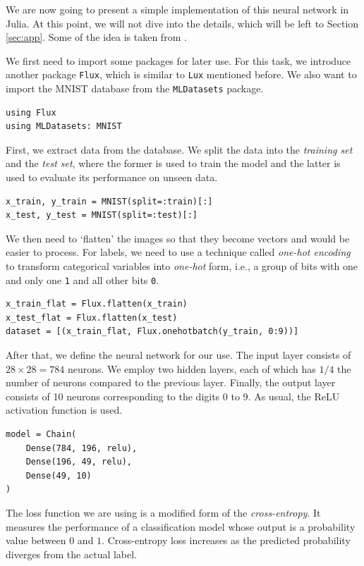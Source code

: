 \documentclass[a4paper,11pt,titlepage]{article}
\theoremstyle{definition}
\theoremstyle{plain}
\theoremstyle{remark}
\begin{document}
We are now going to present a simple implementation of this neural network in Julia. At this point, we will not dive into the details, which will be left to Section \ref{sec:app}. Some of the idea is taken from \cite{Piotr}.

We first need to import some packages for later use. For this task, we introduce another package \verb|Flux|, which is similar to \verb|Lux| mentioned before. We also want to import the MNIST database from the \verb|MLDatasets| package.

\begin{verbatim}
using Flux
using MLDatasets: MNIST
\end{verbatim}

First, we extract data from the database. We split the data into the \textit{training set} and the \textit{test set}, where the former is used to train the model and the latter is used to evaluate its performance on unseen data.

\begin{verbatim}
x_train, y_train = MNIST(split=:train)[:]
x_test, y_test = MNIST(split=:test)[:]
\end{verbatim}

We then need to ‘flatten’ the images so that they become vectors and would be easier to process. For labels, we need to use a technique called \textit{one-hot encoding} to transform categorical variables into \textit{one-hot} form, i.e., a group of bits with one and only one \verb|1| and all other bits \verb|0|.

\begin{verbatim}
x_train_flat = Flux.flatten(x_train)
x_test_flat = Flux.flatten(x_test)
dataset = [(x_train_flat, Flux.onehotbatch(y_train, 0:9))]
\end{verbatim}

After that, we define the neural network for our use. The input layer consists of $28\times 28 = 784$ neurons. We employ two hidden layers, each of which has $1/4$ the number of neurons compared to the previous layer. Finally, the output layer consists of 10 neurons corresponding to the digits 0 to 9. As usual, the ReLU activation function is used.

\begin{verbatim}
model = Chain(
    Dense(784, 196, relu),
    Dense(196, 49, relu),
    Dense(49, 10)
)
\end{verbatim}

The loss function we are using is a modified form of the \textit{cross-entropy}. It measures the performance of a classification model whose output is a probability value between $0$ and $1$. Cross-entropy loss increases as the predicted probability diverges from the actual label.
\end{document}
